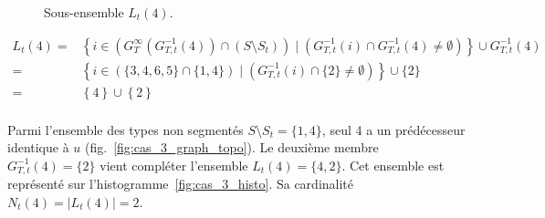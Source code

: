 \begin{figure}[!ht]
{		  
	      }\caption{Sous-ensemble $L_t(4)$.}
         \label{fig:cas_3}
	\end{figure}

	\begin{equation}
	\begin{split}
	 L_t(4) = & \left\{ i \in \left( G_T^{\infty}(G_{T,t}^{-1}(4)) \cap ( S \setminus S_t ) \right)\;|\; \left( G_{T,t}^{-1} (i) \cap G_{T,t}^{-1} (4) \neq \emptyset \right) \right\} \cup  G_{T,t}^{-1}(4)\\
		= & \left\{ i \in \left( \{3,4,6,5\} \cap \{1,4\} \right)\;|\; \left( G_{T,t}^{-1} (i) \cap \{2\} \neq \emptyset \right) \right\} \cup  \{2\}\\
		= & \left\{ 4 \right\} \cup \left\{ 2 \right\} \\
	\end{split}
	\end{equation}

	Parmi l'ensemble des types non segmentés $S \setminus S_t = \{1,4\}$, seul 4 a un prédécesseur identique à $u$ (fig.~\ref{fig:cas_3_graph_topo}). Le deuxième membre $G_{T,t}^{-1}(4) = \{2\}$ vient compléter l'ensemble $L_t(4) = \{4,2\}$. Cet ensemble est représenté sur l'histogramme~\ref{fig:cas_3_histo}. Sa cardinalité $N_t(4) = \left|{L_t(4)}\right| = 2$.\vspace{1em}
 
